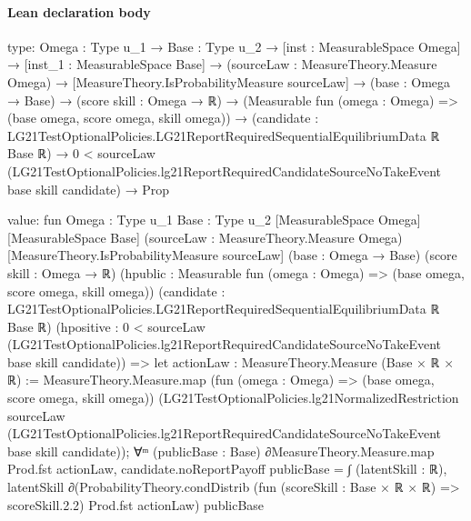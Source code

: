 \documentclass[10pt]{article}
\begin{document}
\paragraph{Lean declaration body}
\begin{ReviewVerbatim}
type:
{Omega : Type u_1} →
  {Base : Type u_2} →
    [inst : MeasurableSpace Omega] →
      [inst_1 : MeasurableSpace Base] →
        (sourceLaw : MeasureTheory.Measure Omega) →
          [MeasureTheory.IsProbabilityMeasure sourceLaw] →
            (base : Omega → Base) →
              (score skill : Omega → ℝ) →
                (Measurable fun (omega : Omega) => (base omega, score omega, skill omega)) →
                  (candidate : LG21TestOptionalPolicies.LG21ReportRequiredSequentialEquilibriumData ℝ Base ℝ) →
                    0 <
                        sourceLaw
                          (LG21TestOptionalPolicies.lg21ReportRequiredCandidateSourceNoTakeEvent base skill candidate) →
                      Prop

value:
fun {Omega : Type u_1} {Base : Type u_2} [MeasurableSpace Omega] [MeasurableSpace Base]
    (sourceLaw : MeasureTheory.Measure Omega) [MeasureTheory.IsProbabilityMeasure sourceLaw] (base : Omega → Base)
    (score skill : Omega → ℝ) (hpublic : Measurable fun (omega : Omega) => (base omega, score omega, skill omega))
    (candidate : LG21TestOptionalPolicies.LG21ReportRequiredSequentialEquilibriumData ℝ Base ℝ)
    (hpositive :
      0 < sourceLaw (LG21TestOptionalPolicies.lg21ReportRequiredCandidateSourceNoTakeEvent base skill candidate)) =>
  let actionLaw : MeasureTheory.Measure (Base × ℝ × ℝ) :=
    MeasureTheory.Measure.map (fun (omega : Omega) => (base omega, score omega, skill omega))
      (LG21TestOptionalPolicies.lg21NormalizedRestriction sourceLaw
        (LG21TestOptionalPolicies.lg21ReportRequiredCandidateSourceNoTakeEvent base skill candidate));
  ∀ᵐ (publicBase : Base) ∂MeasureTheory.Measure.map Prod.fst actionLaw,
    candidate.noReportPayoff publicBase =
      ∫ (latentSkill : ℝ),
        latentSkill ∂(ProbabilityTheory.condDistrib (fun (scoreSkill : Base × ℝ × ℝ) => scoreSkill.2.2) Prod.fst
            actionLaw)
          publicBase
\end{ReviewVerbatim}
\end{document}
